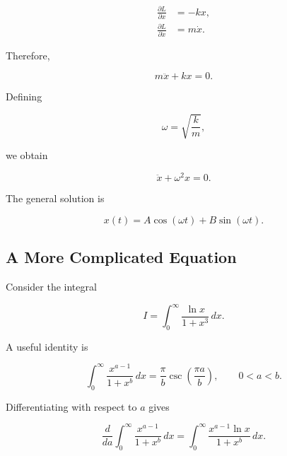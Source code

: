 \documentclass[12pt,a4paper]{article}
\begin{document}
	\begin{align}
		\frac{\partial L}{\partial x}
		&= -kx, \\
		\frac{\partial L}{\partial \dot{x}}
		&= m\dot{x}.
	\end{align}
	
	Therefore,
	
	\begin{equation}
		m\ddot{x} + kx = 0.
	\end{equation}
	
	Defining
	
	\begin{equation}
		\omega = \sqrt{\frac{k}{m}},
	\end{equation}
	
	we obtain
	
	\begin{equation}
		\boxed{
			\ddot{x} + \omega^2 x = 0
		}.
	\end{equation}
	
	The general solution is
	
	\begin{equation}
		x(t)
		=
		A\cos(\omega t)
		+
		B\sin(\omega t).
	\end{equation}
	
	\subsection{A More Complicated Equation}
	
	Consider the integral
	
	\begin{equation}
		I =
		\int_0^\infty
		\frac{\ln x}{1+x^3}\,dx.
	\end{equation}
	
	A useful identity is
	
	\begin{equation}
		\int_0^\infty
		\frac{x^{a-1}}{1+x^b}\,dx
		=
		\frac{\pi}{b}
		\csc\left(\frac{\pi a}{b}\right),
		\qquad
		0<a<b.
	\end{equation}
	
	Differentiating with respect to $a$ gives
	
	\begin{equation}
		\frac{d}{da}
		\int_0^\infty
		\frac{x^{a-1}}{1+x^b}\,dx
		=
		\int_0^\infty
		\frac{x^{a-1}\ln x}{1+x^b}\,dx.
	\end{equation}
	
\end{document}
